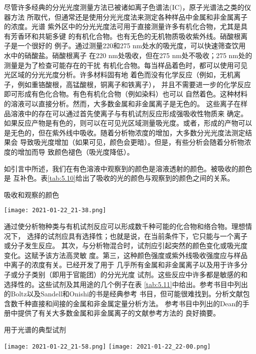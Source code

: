 尽管许多经典的分光光度测量方法已被诸如离子色谱法(IC)，原子光谱法之类的仪器方法
所取代，但通常还是使用分光光度法来测定各种样品中金属和非金属离子的浓度。光谱
紫外区中的分光光度法可用于直接测量许多有机化合物，尤其是具有芳香环和共轭多键
的有机化合物。也有无色的无机物质吸收紫外线。硝酸根离子是一个很好的
例子。通过测量220和275 nm处水的吸光度，可以快速筛查饮用水中的硝酸盐。硝酸根离子
在220 nm处吸收，但在275 nm处不吸收；275 nm处的测量是为了检查可能存在的干扰
有机化合物。每当样品着色时，都可以使用可见光区域的分光光度分析。许多材料固有地
着色而没有化学反应（例如，无机离子，例如重铬酸根，高锰酸根，铜离子和铁离子），
并且不需要进一步的化学反应即可形成有色化合物。有色有机化合物（例如染料）也可以
自然着色。这种材料的溶液可以直接分析。然而，大多数金属和非金属离子是无色的。
这些离子在样品溶液中的存在可以通过首先使离子与有机试剂反应形成强吸收性物质来
确定。如果反应产物是有色的，则可以在可见光区域测量吸光度。或者，形成的产物可以
是无色的，但在紫外线中吸收。随着分析物浓度的增加，大多数分光光度法测定结果会
导致吸光度增加（如果可见，颜色会更暗）。但是，有些分析会随着分析物浓度的增加而导
致颜色褪色（吸光度降低）。

如引言中所述，我们在有色溶液中观察到的颜色是溶液透射的颜色。被吸收的颜色是
互补色。表\ref{tab:5.10}给出了吸收的光的颜色与观察到的颜色之间的关系。
\begin{table}[htbp]
    \centering
    \caption{吸收和观察的颜色}
    \label{tab:5.10}
    \texttt{[image: 2021-01-22\_21-38.png]}
\end{table}

通过使分析物种类与有机试剂反应可以形成数千种可能的化合物和络合物。理想情况下，
选择的试剂应具有选择性；也就是说，在当前条件下，它只能与一个离子或分子发生反应。
其次，与分析物混合时，试剂应引起突然的颜色变化或吸光度变化。这赋予该方法高灵敏
度。第三，这种颜色强度或紫外线吸收强度应与样品中离子的浓度有关。已经开发了用于
几乎所有金属和非金属离子以及用于许多分子或分子类别（即用于官能团）的分光光度
试剂。这些反应中许多都是敏感的和选择性的。这些试剂及其用途的几个例子在表
\ref{tab:5.11}中给出。参考书目中列出的Boltz以及Sandell和Onishi的书是经典参考
书目，但可能很难找到。分析文献包含数千种直接和间接的金属和非金属定量分析方法。
参考书目中列出的Dean的手册中提供了有关大多数金属和非金属离子的文献参考方法的
良好摘要。
\begin{table}[htbp]
    \centering
    \caption{用于光谱的典型试剂}
    \label{tab:5.11}
    \texttt{[image: 2021-01-22\_21-58.png]}
    \texttt{[image: 2021-01-22\_22-00.png]}
\end{table}


